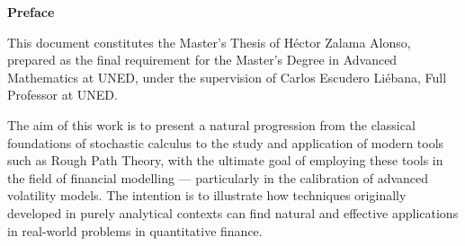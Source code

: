{\Huge \textbf{Preface}}

\vspace{0.6cm}



This document constitutes the Master’s Thesis of Héctor Zalama Alonso, prepared as the final requirement for the Master’s Degree in Advanced Mathematics at UNED, under the supervision of Carlos Escudero Liébana, Full Professor at UNED.

The aim of this work is to present a natural progression from the classical foundations of stochastic calculus to the study and application of modern tools such as Rough Path Theory, with the ultimate goal of employing these tools in the field of financial modelling — particularly in the calibration of advanced volatility models. The intention is to illustrate how techniques originally developed in purely analytical contexts can find natural and effective applications in real-world problems in quantitative finance.
